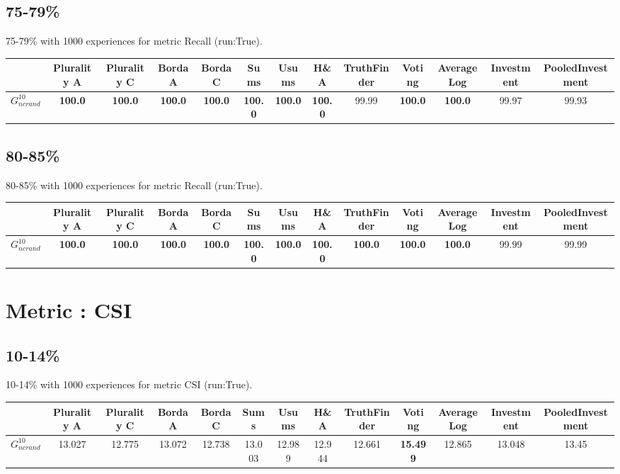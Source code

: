 \documentclass{article}
\newcommand{\graph}[2]{$G_{#1}^{#2}$}
\begin{document}
\subsection{75-79\%}

75-79\% with 1000 experiences for metric Recall (run:True).

\noindent\begin{tabular}{|l|c|c|c|c|c|c|c|c|c|c|c|c|}
\hline
& Plurality A& Plurality C& Borda A& Borda C& Sums& Usums& H\&A& TruthFinder& Voting& AverageLog& Investment& PooledInvestment\\
\hline
\graph{ncrand}{10} &\textbf{100.0}&\textbf{100.0}&\textbf{100.0}&\textbf{100.0}&\textbf{100.0}&\textbf{100.0}&\textbf{100.0}&99.99&\textbf{100.0}&\textbf{100.0}&99.97&99.93\\
\hline
\end{tabular}
\newpage

\subsection{80-85\%}

80-85\% with 1000 experiences for metric Recall (run:True).

\noindent\begin{tabular}{|l|c|c|c|c|c|c|c|c|c|c|c|c|}
\hline
& Plurality A& Plurality C& Borda A& Borda C& Sums& Usums& H\&A& TruthFinder& Voting& AverageLog& Investment& PooledInvestment\\
\hline
\graph{ncrand}{10} &\textbf{100.0}&\textbf{100.0}&\textbf{100.0}&\textbf{100.0}&\textbf{100.0}&\textbf{100.0}&\textbf{100.0}&\textbf{100.0}&\textbf{100.0}&\textbf{100.0}&99.99&99.99\\
\hline
\end{tabular}
\newpage
\newpage
\section{Metric : CSI}

\newpage

\subsection{10-14\%}

10-14\% with 1000 experiences for metric CSI (run:True).

\noindent\begin{tabular}{|l|c|c|c|c|c|c|c|c|c|c|c|c|}
\hline
& Plurality A& Plurality C& Borda A& Borda C& Sums& Usums& H\&A& TruthFinder& Voting& AverageLog& Investment& PooledInvestment\\
\hline
\graph{ncrand}{10} &13.027&12.775&13.072&12.738&13.003&12.989&12.944&12.661&\textbf{15.499}&12.865&13.048&13.45\\
\hline
\end{tabular}
\newpage
\end{document}
